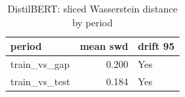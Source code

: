 \begin{table}[ht]
\centering
\caption{DistilBERT: sliced Wasserstein distance by period}
\label{tab:distilbert_period_swd}
\begin{tabular}{lrl}
\toprule
period & mean swd & drift 95 \\
\midrule
train\_vs\_gap & 0.200 & Yes \\
train\_vs\_test & 0.184 & Yes \\
\bottomrule
\end{tabular}
\end{table}
